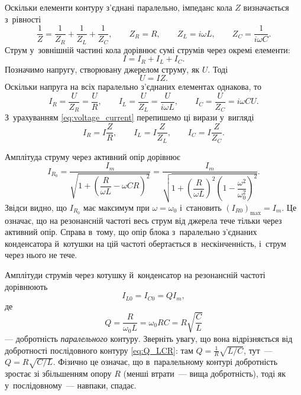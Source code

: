 Оскільки елементи контуру з'єднані паралельно, імпеданс кола $Z$ визначається з~рівності
\begin{equation*}
	\frac{1}{Z} = \frac{1}{Z_R} + \frac{1}{Z_L} + \frac{1}{Z_C}, \qquad
	Z_R = R, \qquad Z_L = i\omega L, \qquad Z_C = \frac{1}{i\omega C}.
\end{equation*}
Струм у~зовнішній частині кола дорівнює сумі струмів через окремі елементи:
\begin{equation*}
	I = I_R + I_L + I_C.
\end{equation*}
Позначимо напругу, створювану джерелом струму, як $U$. Тоді
\begin{equation}\label{eq:voltage_current}
	U = IZ.
\end{equation}
Оскільки напруга на всіх паралельно з'єднаних елементах однакова, то
\begin{equation*}
	I_R = \frac{U}{Z_R} = \frac{U}{R}, \qquad
	I_L = \frac{U}{Z_L} = \frac{U}{i\omega L}, \qquad
	I_C = \frac{U}{Z_C} = i\omega C U.
\end{equation*}
З~урахуванням \eqref{eq:voltage_current} перепишемо ці вирази у~вигляді
\begin{equation*}
	I_R = I\frac{Z}{R}, \qquad
	I_L = I\frac{Z}{Z_L}, \qquad
	I_C = I\frac{Z}{Z_C}.
\end{equation*}

Амплітуда струму через активний опір дорівнює
\begin{equation*}
	I_{R_0} = \frac{I_m}{\sqrt{1 + \left(\dfrac{R}{\omega L} - \omega C R\right)^2}}
	= \frac{I_m}{\sqrt{1 + \left(\dfrac{R}{\omega L}\right)^2\left(1 - \dfrac{\omega^2}{\omega_0^2}\right)^2}}.
\end{equation*}
Звідси видно, що $I_{R_0}$ має максимум при $\omega = \omega_0$ і~становить $(I_{R0})_{\max} = I_m$. Це означає, що на резонансній частоті весь струм від джерела тече тільки через активний опір. Справа в~тому, що опір блока з~паралельно з'єднаних конденсатора й~котушки на цій частоті обертається в~нескінченність, і~струм через нього не тече.

Амплітуди струмів через котушку й~конденсатор на резонансній частоті дорівнюють
\begin{equation*}
	I_{L0} = I_{C0} = QI_m,
\end{equation*}
де
\begin{equation*}
	Q = \frac{R}{\omega_0 L} = \omega_0 R C = R\sqrt{\frac{C}{L}}
\end{equation*}
--- добротність \emph{паралельного} контуру. Зверніть увагу, що вона відрізняється від добротності послідовного контуру \eqref{eq:Q_LCR}: там $Q = \frac{1}{R}\sqrt{L/C}$, тут~--- $Q = R\sqrt{C/L}$. Фізично це означає, що в~паралельному контурі добротність зростає зі збільшенням опору $R$ (менші втрати~--- вища добротність), тоді як у~послідовному~--- навпаки, спадає.

